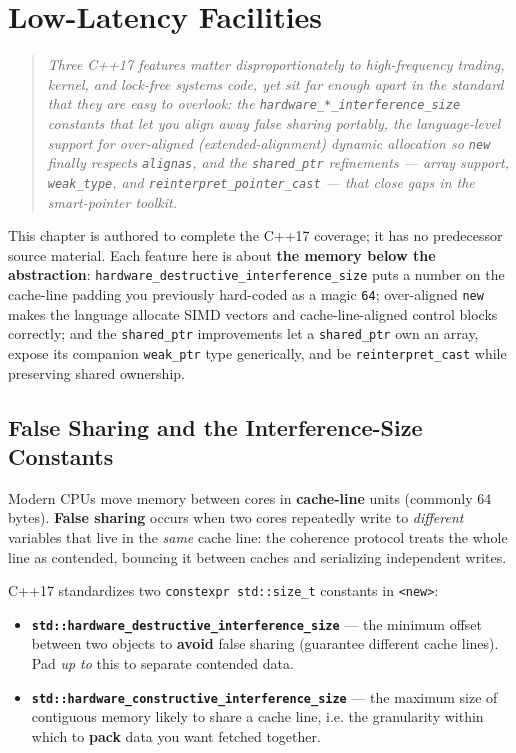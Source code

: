 \chapter{Low-Latency Facilities}
\label{ch:c17-low-latency}

\begin{quote}
\emph{Three C++17 features matter disproportionately to high-frequency trading, kernel, and lock-free systems code, yet sit far enough apart in the standard that they are easy to overlook: the \texttt{hardware\_*\_interference\_size} constants that let you align away false sharing portably, the language-level support for over-aligned (extended-alignment) dynamic allocation so \texttt{new} finally respects \texttt{alignas}, and the \texttt{shared\_ptr} refinements --- array support, \texttt{weak\_type}, and \texttt{reinterpret\_pointer\_cast} --- that close gaps in the smart-pointer toolkit.}
\end{quote}

This chapter is authored to complete the C++17 coverage; it has no predecessor source material. Each feature here is about \textbf{the memory below the abstraction}: \texttt{hardware\_destructive\_interference\_size} puts a number on the cache-line padding you previously hard-coded as a magic \texttt{64}; over-aligned \texttt{new} makes the language allocate SIMD vectors and cache-line-aligned control blocks correctly; and the \texttt{shared\_ptr} improvements let a \texttt{shared\_ptr} own an array, expose its companion \texttt{weak\_ptr} type generically, and be \texttt{reinterpret\_cast} while preserving shared ownership.

\section{False Sharing and the Interference-Size Constants}
\label{sec:c17-false-sharing}

Modern CPUs move memory between cores in \textbf{cache-line} units (commonly 64 bytes). \textbf{False sharing} occurs when two cores repeatedly write to \emph{different} variables that live in the \emph{same} cache line: the coherence protocol treats the whole line as contended, bouncing it between caches and serializing independent writes.

C++17 standardizes two \texttt{constexpr std::size\_t} constants in \texttt{<new>}:

\begin{itemize}
\item \textbf{\texttt{std::hardware\_destructive\_interference\_size}} --- the minimum offset between two objects to \textbf{avoid} false sharing (guarantee different cache lines). Pad \emph{up to} this to separate contended data.
\item \textbf{\texttt{std::hardware\_constructive\_interference\_size}} --- the maximum size of contiguous memory likely to share a cache line, i.e. the granularity within which to \textbf{pack} data you want fetched together.
\end{itemize}

